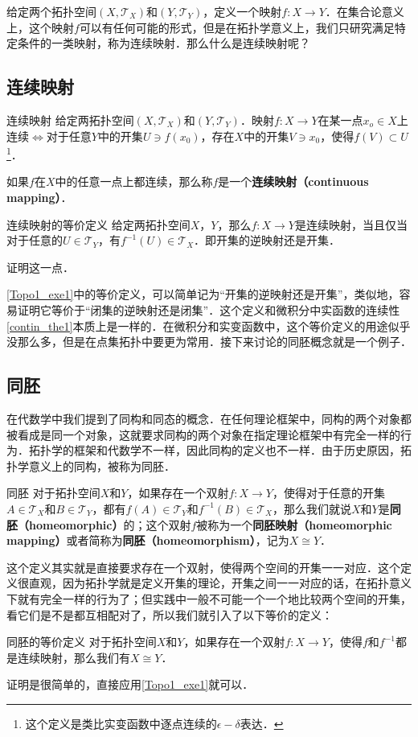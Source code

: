 给定两个拓扑空间$(X, \mathcal{T}_X)$和$(Y, \mathcal{T}_Y)$，定义一个映射$f:X\rightarrow Y$．在集合论意义上，这个映射$f$可以有任何可能的形式，但是在拓扑学意义上，我们只研究满足特定条件的一类映射，称为连续映射．那么什么是连续映射呢？

\subsection{连续映射}
\begin{definition}{连续映射}
给定两拓扑空间$(X, \mathcal{T}_X)$和$(Y, \mathcal{T}_Y)$．映射$f:X\rightarrow Y$在某一点$x_o\in X$上连续$\iff$对于任意$Y$中的开集$U\ni f(x_0)$，存在$X$中的开集$V\ni x_0$，使得$f(V)\subset U$\footnote{这个定义是类比实变函数中逐点连续的$\epsilon-\delta$表达．}．

如果$f$在$X$中的任意一点上都连续，那么称$f$是一个\textbf{连续映射（continuous mapping）}．
\end{definition}

\begin{exercise}{连续映射的等价定义}\label{Topo1_exe1}
给定两拓扑空间$X$，$Y$，那么$f:X\rightarrow Y$是连续映射，当且仅当对于任意的$U\in\mathcal{T}_Y$，有$f^{-1}(U)\in\mathcal{T}_X$．即开集的逆映射还是开集．

证明这一点．
\end{exercise}

\autoref{Topo1_exe1}中的等价定义，可以简单记为“开集的逆映射还是开集”，类似地，容易证明它等价于“闭集的逆映射还是闭集”．这个定义和微积分中实函数的连续性\autoref{contin_the1}本质上是一样的．在微积分和实变函数中，这个等价定义的用途似乎没那么多，但是在点集拓扑中要更为常用．接下来讨论的同胚概念就是一个例子．

\subsection{同胚}

在代数学中我们提到了同构和同态的概念．在任何理论框架中，同构的两个对象都被看成是同一个对象，这就要求同构的两个对象在指定理论框架中有完全一样的行为．拓扑学的框架和代数学不一样，因此同构的定义也不一样．由于历史原因，拓扑学意义上的同构，被称为同胚．

\begin{definition}{同胚}
对于拓扑空间$X$和$Y$，如果存在一个双射$f:X\rightarrow Y$，使得对于任意的开集$A\in\mathcal{T}_X$和$B\in\mathcal{T}_Y$，都有$f(A)\in\mathcal{T}_Y$和$f^{-1}(B)\in\mathcal{T}_X$，那么我们就说$X$和$Y$是\textbf{同胚（homeomorphic）}的；这个双射$f$被称为一个\textbf{同胚映射（homeomorphic mapping）}或者简称为\textbf{同胚（homeomorphism）}，记为$X\cong Y$．
\end{definition}

这个定义其实就是直接要求存在一个双射，使得两个空间的开集一一对应．这个定义很直观，因为拓扑学就是定义开集的理论，开集之间一一对应的话，在拓扑意义下就有完全一样的行为了；但实践中一般不可能一个一个地比较两个空间的开集，看它们是不是都互相配对了，所以我们就引入了以下等价的定义：

\begin{theorem}{同胚的等价定义}
对于拓扑空间$X$和$Y$，如果存在一个双射$f:X\rightarrow Y$，使得$f$和$f^{-1}$都是连续映射，那么我们有$X\cong Y$．
\end{theorem}

证明是很简单的，直接应用\autoref{Topo1_exe1}就可以．
